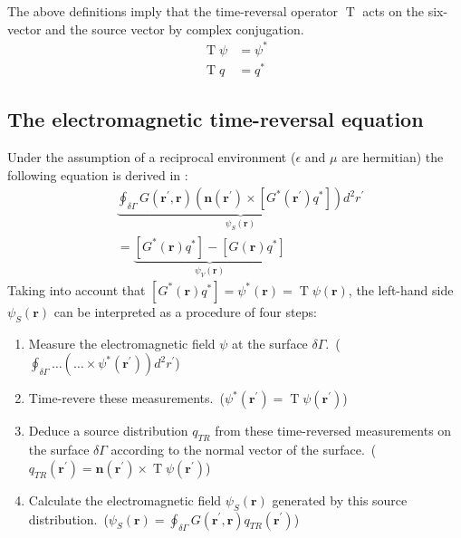 The above definitions imply that the time-reversal operator \(\operatorname{T}\) acts on the six-vector and the source vector by complex conjugation.
\begin{align}
    \operatorname{T}\psi &= \psi^* \\
    \operatorname{T}q &= q^*
\end{align}

\subsection{The electromagnetic time-reversal equation}
Under the assumption of a reciprocal environment (\(\epsilon \) and \(\mu \) are hermitian) the following equation is derived in \parencite{de_rosny_theory_2010}:
\begin{equation}\label{time-reversal-equation}
    \begin{aligned}
    & \underbrace{\oint_{\delta \Gamma} G(\mathbf{r}^{\prime}, \mathbf{r})\left(\mathbf{n}\left(\mathbf{r}^{\prime}\right) \times\left[G^*\left(\mathbf{r}^{\prime}\right) q^*\right]\right) d^2 r^{\prime}}_{\psi_S(\mathbf{r})} \\
    &=\underbrace{[G^*(\mathbf{r}) q^*] - [G(\mathbf{r}) q^*]}_{\psi_V(\mathbf{r})}
    \end{aligned}
\end{equation}
Taking into account that \([G^*(\mathbf{r}) q^*] = \psi^*(\mathbf{r}) = \operatorname{T}\psi(\mathbf{r})\), the left-hand side \(\psi_S(\mathbf{r})\) can be interpreted as a procedure of four steps:
\begin{enumerate}
    \item Measure the electromagnetic field \(\psi \) at the surface \(\delta \Gamma \).\ (\(\oint_{\delta \Gamma} \ldots  (\ldots \times \psi^*(\mathbf{r}^{\prime})) d^2 r^{\prime}\))
    \item Time-revere these measurements.\ (\(\psi^*(\mathbf{r}^{\prime}) = \operatorname{T}\psi(\mathbf{r}^{\prime})\))
    \item Deduce a source distribution \(q_{TR}\) from these time-reversed measurements on the surface \(\delta \Gamma \) according to the normal vector of the surface.\ (\(q_{TR}(\mathbf{r}^{\prime}) = \mathbf{n}(\mathbf{r}^{\prime}) \times \operatorname{T}\psi(\mathbf{r}^{\prime})\))
    \item Calculate the electromagnetic field \(\psi_S(\mathbf{r})\) generated by this source distribution.\ (\(\psi_S(\mathbf{r}) = \oint_{\delta \Gamma} G(\mathbf{r}^{\prime}, \mathbf{r}) q_{TR}(\mathbf{r}^{\prime})\))
\end{enumerate}
